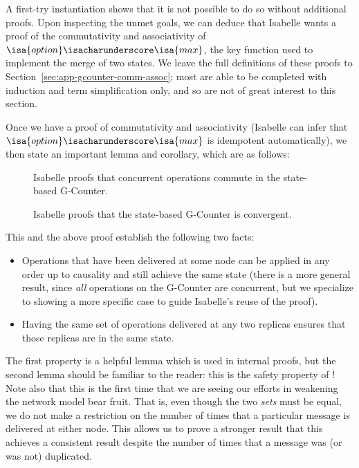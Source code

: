 A first-try instantiation shows that it is not possible to do so without
additional proofs. Upon inspecting the unmet goals, we can deduce that Isabelle
wants a proof of the commutativity and associativity of
$\isa{option}\isacharunderscore\isa{max}$, the key function used to implement
the merge of two states. We leave the full definitions of these proofs to
Section~\ref{sec:app-gcounter-comm-assoc}; most are able to be completed with
induction and term simplification only, and so are not of great interest to this
section.

Once we have a proof of commutativity and associativity (Isabelle can infer that
$\isa{option}\isacharunderscore\isa{max}$ is idempotent automatically), we then
state an important lemma and corollary, which are as follows:

\begin{figure}[H]
  
  \caption{Isabelle proofs that concurrent operations commute in the state-based
    G-Counter.}
\end{figure}

\begin{figure}[H]
  
  \caption{Isabelle proofs that the state-based G-Counter is convergent.}
\end{figure}

This and the above proof establish the following two facts:
\begin{itemize}
  \item Operations that have been delivered at some node can be applied in any
    order up to causality and still achieve the same state (there is a more
    general result, since \emph{all} operations on the G-Counter are concurrent,
    but we specialize to showing a more specific case to guide Isabelle's reuse
    of the proof).
  \item Having the same set of operations delivered at any two replicas ensures
    that those replicas are in the same state.
\end{itemize}

The first property is a helpful lemma which is used in internal proofs, but the
second lemma should be familiar to the reader: this is the safety property of
\SEC! Note also that this is the first time that we are seeing our efforts in
weakening the network model bear fruit. That is, even though the two \emph{sets}
must be equal, we do not make a restriction on the number of times that a
particular message is delivered at either node. This allows us to prove a
stronger result that this \CRDT achieves a consistent result despite the number
of times that a message was (or was not) duplicated.

